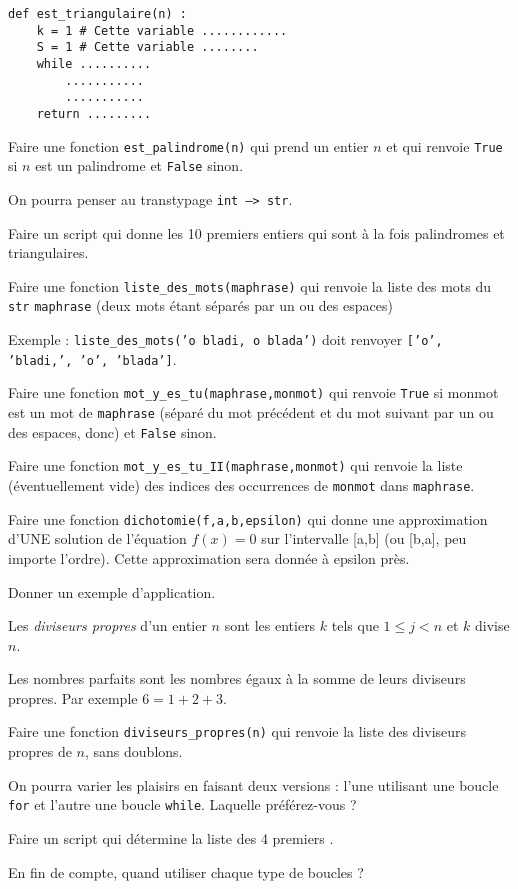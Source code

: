 \begin{enonce}
	\begin{verbatim}
def est_triangulaire(n) :
    k = 1 # Cette variable ............
    S = 1 # Cette variable ........
    while ..........
        ...........
        ...........
    return .........
\end{verbatim}


	\ssques Faire une fonction \texttt{est\_palindrome(n)} qui prend un entier $n$ et qui renvoie \texttt{True} si $n$ est un palindrome et \texttt{False} sinon.

	\indic On pourra penser au transtypage \texttt{int --> str}.



	\ssques Faire un script qui donne les 10 premiers entiers qui sont à la fois palindromes et triangulaires.


	\quessques Faire une fonction \texttt{liste\_des\_mots(maphrase)} qui renvoie la liste des mots du \texttt{str} \texttt{maphrase} (deux mots étant séparés par un ou des espaces)

	Exemple : \texttt{liste\_des\_mots('o bladi,      o blada')} doit renvoyer
	\texttt{['o', 'bladi,', 'o', 'blada']}.

	\pagebreak

	\ssques Faire une fonction \texttt{mot\_y\_es\_tu(maphrase,monmot)} qui renvoie \texttt{True} si monmot est un mot de \texttt{maphrase} (séparé du mot précédent et du mot suivant par un ou des espaces, donc) et \texttt{False} sinon.

	\ssques Faire une fonction \texttt{mot\_y\_es\_tu\_II(maphrase,monmot)} qui renvoie la liste (éventuellement vide) des indices des occurrences de \texttt{monmot} dans \texttt{maphrase}.


	\ques Faire une fonction \texttt{dichotomie(f,a,b,epsilon)} qui donne une approximation d'UNE solution de l'équation $f(x) = 0$ sur l'intervalle [a,b] (ou [b,a], peu importe l'ordre). Cette approximation sera donnée à epsilon près.

	Donner un exemple d'application.

	\ques Les {\em diviseurs propres} d'un entier $n$ sont les entiers $k$ tels que $1\leq j< n$ et $k$ divise $n$.

	Les nombres parfaits sont les nombres  égaux à la somme de leurs diviseurs propres. Par exemple $6 =1+2+3.$

	\ssques Faire une fonction \texttt{diviseurs\_propres(n)} qui renvoie la liste des diviseurs propres de $n$, sans doublons.

	On pourra varier les plaisirs en faisant deux versions : l'une  utilisant une boucle \texttt{for} et l'autre une boucle \texttt{while}. Laquelle préférez-vous ?

	\ssques Faire un script qui détermine la liste des 4 premiers .

	\ques En fin de compte, quand utiliser chaque type de boucles ?

\end{enonce}

